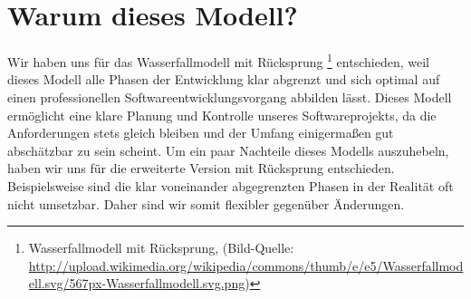 \section{Warum dieses Modell?}
Wir haben uns für das Wasserfallmodell mit Rücksprung
\footnote{Wasserfallmodell mit Rücksprung, (Bild-Quelle: \url{http://upload.wikimedia.org/wikipedia/commons/thumb/e/e5/Wasserfallmodell.svg/567px-Wasserfallmodell.svg.png})}
entschieden, weil dieses Modell alle Phasen der 
Entwicklung klar abgrenzt und sich optimal auf einen professionellen Softwareentwicklungsvorgang
abbilden lässt. Dieses Modell ermöglicht eine klare Planung und Kontrolle unseres Softwareprojekts,
da die Anforderungen stets gleich bleiben und der Umfang einigermaßen gut abschätzbar zu sein scheint.
Um ein paar Nachteile dieses Modells auszuhebeln, haben wir uns für die erweiterte Version mit Rücksprung entschieden.
Beispielsweise sind die klar voneinander abgegrenzten Phasen
in der Realität oft nicht umsetzbar. Daher sind wir somit flexibler gegenüber Änderungen.
